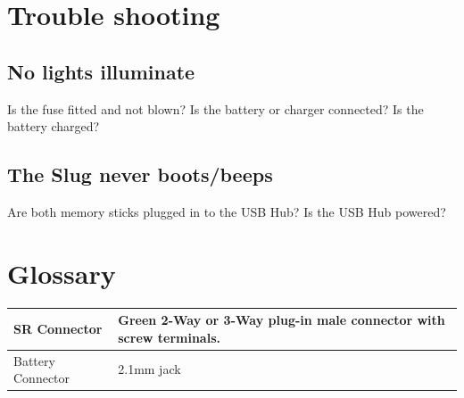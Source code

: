 \documentclass[a4paper, 12pt]{article}
\begin{document}
\section{Trouble shooting}
\subsection{No lights illuminate}
Is the fuse fitted and not blown? Is the battery or charger connected? Is the battery charged?
\subsection{The Slug never boots/beeps}
Are both memory sticks plugged in to the USB Hub? Is the USB Hub powered?
\section{Glossary}
\begin{tabular}{| l | p{5cm}|}
\hline
SR Connector & Green 2-Way or 3-Way plug-in male connector with screw terminals. \\ \hline
Battery Connector & 2.1mm jack \\
\hline
\end{tabular}
\end{document}
